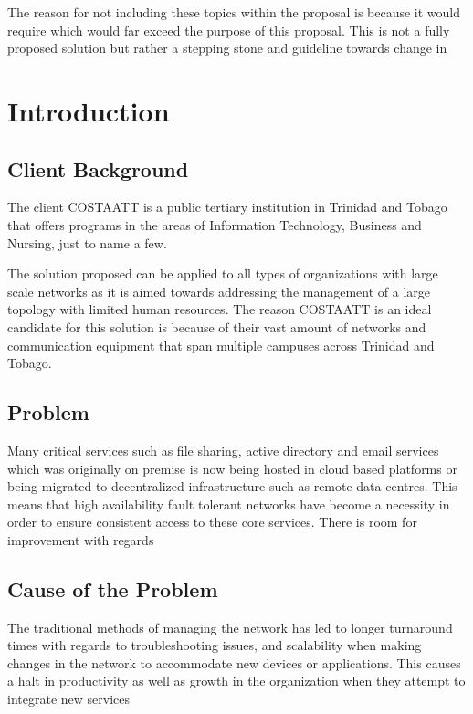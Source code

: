 \documentclass[12pt, letterpaper]{article}
\begin{document}
The reason for not including these topics within the proposal is because it would require 
which would far exceed the purpose of this proposal. This is not a fully proposed solution but rather a stepping stone and guideline towards change in

	
	
\newpage
\section{Introduction}

	\subsection{Client Background}
The client COSTAATT is a public tertiary institution in Trinidad and Tobago that offers programs in the areas of Information Technology, Business and Nursing, just to name a few.
	
\medskip

The solution proposed can be applied to all types of organizations with large scale networks as it is aimed towards addressing the management of a large topology with limited human resources. The reason COSTAATT is an ideal candidate for this solution is because of their vast amount of networks and communication equipment that span multiple campuses across Trinidad and Tobago. 
	
	\subsection{Problem}
Many critical services such as file sharing, active directory and email services which was originally on premise is now being hosted in cloud based platforms or being migrated to decentralized infrastructure such as remote data centres. This means that high availability fault tolerant networks have become a necessity in order to ensure consistent access to these core services. There is room for improvement with regards 

	\subsection{Cause of the Problem}
The traditional methods of managing the network has led to longer turnaround times with regards to troubleshooting issues, and scalability when making changes in the network to accommodate new devices or applications. This causes a halt in productivity as well as growth in the organization when they attempt to integrate new services 
\end{document}
